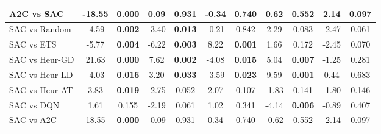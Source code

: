 \begin{tabular}{lcccccccccc}
	A2C vs SAC       & -18.55          & \textbf{0.000}        & 0.09           & 0.931                  & -0.34          & 0.740                  & 0.62           & 0.552                  & 2.14           & 0.097                  \\
	\midrule 
	SAC vs Random    & -4.59           & \textbf{0.002}        & -3.40          & \textbf{0.013}         & -0.21          & 0.842                  & 2.29           & 0.083                  & -2.47          & 0.061                  \\
	SAC vs ETS       & -5.77           & \textbf{0.004}        & -6.22          & \textbf{0.003}         & 8.22           & \textbf{0.001}         & 1.66           & 0.172                  & -2.45          & 0.070                  \\
	SAC vs Heur-GD   & 21.63           & \textbf{0.000}        & 7.62           & \textbf{0.002}         & -4.08          & \textbf{0.015}         & 5.04           & \textbf{0.007}         & -1.25          & 0.281                  \\
	SAC vs Heur-LD   & -4.03           & \textbf{0.016}        & 3.20           & \textbf{0.033}         & -3.59          & \textbf{0.023}         & 9.59           & \textbf{0.001}         & 0.44           & 0.683                  \\
	SAC vs Heur-AT   & 3.83            & \textbf{0.019}        & -2.75          & 0.052                  & 2.07           & 0.107                  & -1.83          & 0.141                  & -1.80          & 0.146                  \\
	SAC vs DQN       & 1.61            & 0.155                 & -2.19          & 0.061                  & 1.02           & 0.341                  & -4.14          & \textbf{0.006}         & -0.89          & 0.407                  \\
	SAC vs A2C       & 18.55           & \textbf{0.000}        & -0.09          & 0.931                  & 0.34           & 0.740                  & -0.62          & 0.552                  & -2.14          & 0.097     \\
	\bottomrule             
\end{tabular}